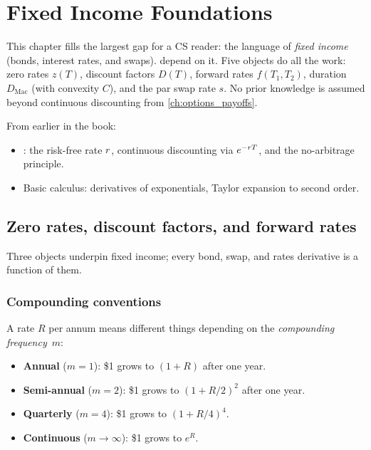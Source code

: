 \chapter{Fixed Income Foundations}
\label{ch:fixed_income_foundations}

This chapter fills the largest gap for a CS reader: the language of
\emph{fixed income} (bonds, interest rates, and swaps).
 depend on it.  Five
objects do all the work: zero rates $z(T)$, discount factors $D(T)$,
forward rates $f(T_1,T_2)$, duration $D_{\text{Mac}}$ (with convexity
$C$), and the par swap rate $s$.  No prior knowledge is assumed beyond
continuous discounting from \cref{ch:options_payoffs}.

\begin{backgroundbox}[Prerequisites]
From earlier in the book:
\begin{itemize}
  \item {}: the risk-free rate $r$,
    continuous discounting via $e^{-r T}$, and the no-arbitrage
    principle.
  \item Basic calculus: derivatives of exponentials, Taylor expansion
    to second order.
\end{itemize}
\end{backgroundbox}


\section{Zero rates, discount factors, and forward rates}
\label{sec:fi_zero_forward}

Three objects underpin fixed income; every bond, swap, and rates
derivative is a function of them.

\subsection{Compounding conventions}

A rate $R$ per annum means different things depending on the
\emph{compounding frequency}~$m$:
\begin{itemize}
  \item \textbf{Annual} ($m=1$): \$1 grows to $(1+R)$ after one year.
  \item \textbf{Semi-annual} ($m=2$): \$1 grows to $(1+R/2)^2$ after
    one year.
  \item \textbf{Quarterly} ($m=4$): \$1 grows to $(1+R/4)^4$.
  \item \textbf{Continuous} ($m\to\infty$): \$1 grows to $e^R$.
\end{itemize}

